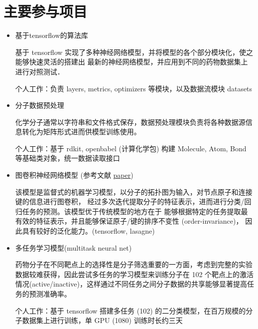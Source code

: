 \documentclass[letterpaper,11pt]{article}
\begin{document}
\section{主要参与项目}
\begin{itemize}

\item 基于tensorflow的算法库

基于 tensorflow 实现了多种神经网络模型，并将模型的各个部分模块化，使之能够快速灵活的搭建出
最新的神经网络模型，并应用到不同的药物数据集上进行对照测试．

个人工作：负责 layers, metrics, optimizers 等模块，以及数据流模块 datasets

\item 分子数据预处理

化学分子通常以字符串和文件格式保存，数据预处理模块负责将各种数据源信息转化为矩阵形式进而供模型训练使用。

个人工作：基于 rdkit, openbabel (计算化学包) 构建 Molecule, Atom, Bond 等基础类对象，统一数据读取接口


\item 图卷积神经网络模型 (参考文献 \href{https://arxiv.org/pdf/1509.09292.pdf}{paper})

该模型是监督式的机器学习模型，以分子的拓扑图为输入，对节点原子和连接键的信息进行图卷积，
经过多次迭代提取分子的特征表示，进而进行分类/回归任务的预测。该模型优于传统模型的地方在于
能够根据特定的任务提取最有效的特征表示，并且能够保证原子/键的排序不变性 (order-invariance)，
因此具有较好的泛化能力。(tensorflow, lasagne)


\item 多任务学习模型(multitask neural net)

药物分子在不同靶点上的选择性是分子筛选重要的一方面，考虑到完整的实验数据较难获得，因此尝试多任务的学习模型来训练分子在 102 个靶点上的激活情况(active/inactive)，这样通过不同任务之间分子数据的共享能够显著提高任务的预测准确率。

个人工作：基于 tensorflow 搭建多任务 (102) 的二分类模型，在百万规模的分子数据集上进行训练，单 GPU (1080) 训练时长约三天


\end{itemize}
\end{document}
